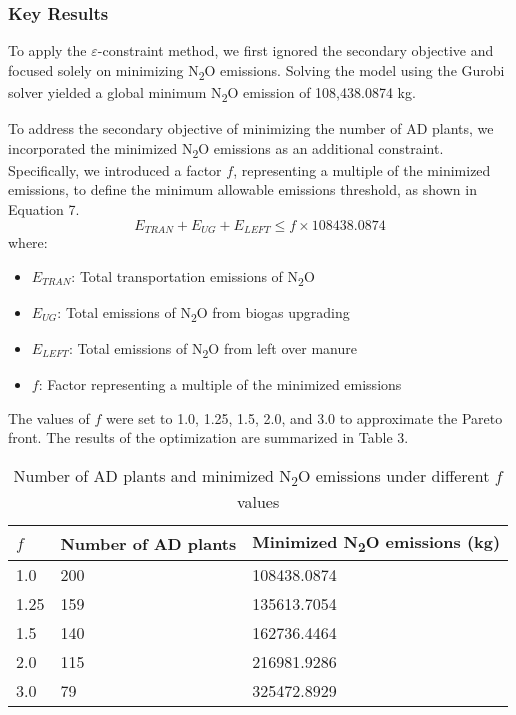 \documentclass[12pt]{article}
\begin{document}
\subsubsection{Key Results}

To apply the $\varepsilon$-constraint method, we first ignored the secondary objective and focused solely on minimizing N\textsubscript{2}O emissions. Solving the model using the Gurobi solver yielded a global minimum N\textsubscript{2}O emission of 108,438.0874 kg.

To address the secondary objective of minimizing the number of AD plants, we incorporated the minimized N\textsubscript{2}O emissions as an additional constraint. Specifically, we introduced a factor 
$f$, representing a multiple of the minimized emissions, to define the minimum allowable emissions threshold, as shown in Equation 7.
\begin{equation}
  E_{TRAN} + E_{UG} + E_{LEFT} \leq f \times 108438.0874
\end{equation}
where:
\begin{itemize}
  \item $E_{TRAN}$: Total transportation emissions of N\textsubscript{2}O
  \item $E_{UG}$: Total emissions of N\textsubscript{2}O from biogas upgrading
  \item $E_{LEFT}$: Total emissions of N\textsubscript{2}O from left over manure
  \item $f$: Factor representing a multiple of the minimized emissions
\end{itemize}
The values of $f$ were set to 1.0, 1.25, 1.5, 2.0, and 3.0 to approximate the Pareto front. The results of the optimization are summarized in Table 3.
\begin{table}[h]
  \centering
  \begin{tabular}{|p{1.5cm} | p{5cm} | p{6cm}|}
  \hline
  \rowcolor{gray!30}
  $f$ & Number of AD plants & Minimized N\textsubscript{2}O emissions (kg) \\ \hline
  1.0 & 200 & 108438.0874 \\ \hline
  1.25 & 159 & 135613.7054 \\ \hline
  1.5 & 140 & 162736.4464 \\ \hline
  2.0 & 115 & 216981.9286 \\ \hline
  3.0 & 79 & 325472.8929 \\ \hline
  \end{tabular}
  \caption{Number of AD plants and minimized N\textsubscript{2}O emissions under different $f$ values}
  \label{tab:adplants_emissions}
\end{table}
\end{document}
